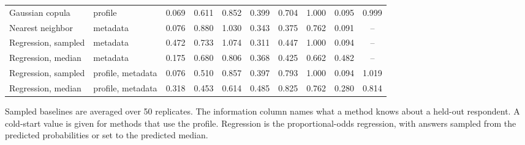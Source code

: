 \begin{table}[pos=!htbp]
\begin{tabular*}{\textwidth}{@{\extracolsep{\fill}}llcccccccc@{}}
Gaussian copula & profile & 0.069 & 0.611 & 0.852 & 0.399 & 0.704 & 1.000 & 0.095 & 0.999 \\
Nearest neighbor & metadata & 0.076 & 0.880 & 1.030 & 0.343 & 0.375 & 0.762 & 0.091 & -- \\
Regression, sampled & metadata & 0.472 & 0.733 & 1.074 & 0.311 & 0.447 & 1.000 & 0.094 & -- \\
Regression, median & metadata & 0.175 & 0.680 & 0.806 & 0.368 & 0.425 & 0.662 & 0.482 & -- \\
Regression, sampled & profile, metadata & 0.076 & 0.510 & 0.857 & 0.397 & 0.793 & 1.000 & 0.094 & 1.019 \\
Regression, median & profile, metadata & 0.318 & 0.453 & 0.614 & 0.485 & 0.825 & 0.762 & 0.280 & 0.814 \\
\bottomrule
\end{tabular*}
\par\smallskip
\scriptsize Sampled baselines are averaged over 50 replicates. The information column names what a method knows about a held-out respondent. A cold-start value is given for methods that use the profile. Regression is the proportional-odds regression, with answers sampled from the predicted probabilities or set to the predicted median.
\end{table}

